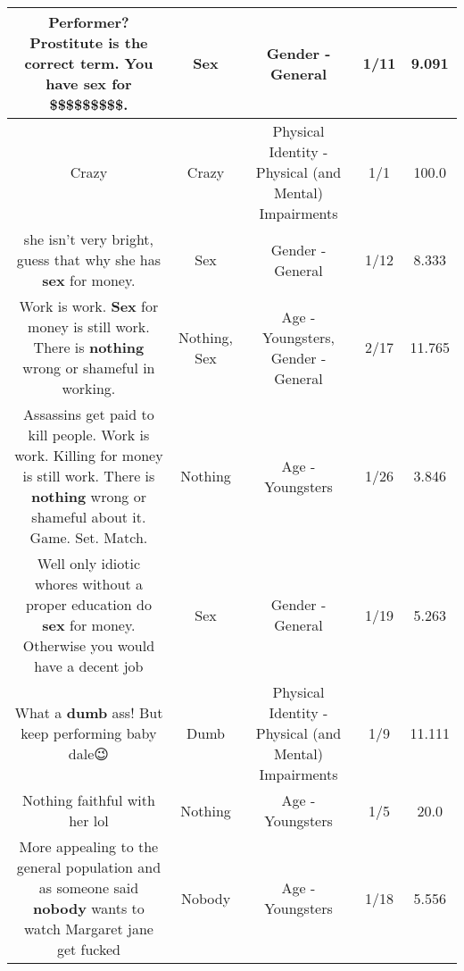 \documentclass[11pt]{article}
\newlength\mylength
\begin{document}
\begin{center}
\begin{longtable}{|C{.65\mylength}|C{.30\mylength}|C{.12\mylength}|C{.12\mylength}|C{.12\mylength}|}
  \small Performer? Prostitute is the correct term. You have \textbf{sex} for \$\$\$\$\$\$\$\$\$.\normalsize   & Sex & Gender - General & 1/11 & 9.091 \\  \hline
  \small Crazy\normalsize   & Crazy & Physical Identity - Physical (and Mental) Impairments & 1/1 & 100.0 \\  \hline
  \small she isn't very bright, guess that why she has \textbf{sex} for money.\normalsize   & Sex & Gender - General & 1/12 & 8.333 \\  \hline
  \small Work is work. \textbf{Sex} for money is still work. There is \textbf{nothing} wrong or shameful in working.\normalsize   & Nothing, Sex & Age - Youngsters, Gender - General & 2/17 & 11.765 \\  \hline
  \small Assassins get paid to kill people. Work is work.  Killing for money is still work.  There is \textbf{nothing} wrong or shameful about it.  Game. Set. Match.\normalsize   & Nothing & Age - Youngsters & 1/26 & 3.846 \\  \hline
  \small Well only idiotic whores without a proper education do \textbf{sex} for money. Otherwise you would have a decent job\normalsize   & Sex & Gender - General & 1/19 & 5.263 \\  \hline
  \small What a \textbf{dumb} ass!  But keep performing baby dale😉\normalsize   & Dumb & Physical Identity - Physical (and Mental) Impairments & 1/9 & 11.111 \\  \hline
  \small Nothing faithful with her lol\normalsize   & Nothing & Age - Youngsters & 1/5 & 20.0 \\  \hline
  \small More appealing to the general population and as someone said \textbf{nobody} wants to watch Margaret jane get fucked\normalsize   & Nobody & Age - Youngsters & 1/18 & 5.556 \\  \hline

\end{longtable}
\end{center}
\end{document}
